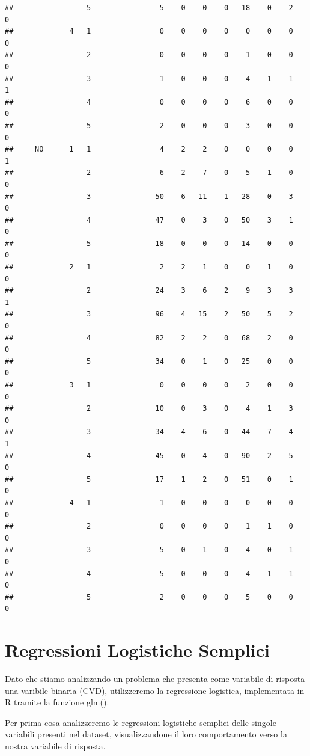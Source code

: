 \documentclass{article}\usepackage[]{graphicx}\usepackage[]{xcolor}
\makeatletter
\newenvironment{kframe}{%
 \def\at@end@of@kframe{}%
 \ifinner\ifhmode%
  \def\at@end@of@kframe{\end{minipage}}%
  \begin{minipage}{\columnwidth}%
 \fi\fi%
 \def\FrameCommand##1{\hskip\@totalleftmargin \hskip-\fboxsep
 \colorbox{shadecolor}{##1}\hskip-\fboxsep
     \hskip-\linewidth \hskip-\@totalleftmargin \hskip\columnwidth}%
 \MakeFramed {\advance\hsize-\width
   \@totalleftmargin\z@ \linewidth\hsize
   \@setminipage}}%
 {\par\unskip\endMakeFramed%
 \at@end@of@kframe}
\newenvironment{knitrout}{}{} %
\makeatother
\begin{document}
\begin{knitrout}
\begin{kframe}
\begin{verbatim}
##                 5                5    0    0    0   18    0    2    0
##             4   1                0    0    0    0    0    0    0    0
##                 2                0    0    0    0    1    0    0    0
##                 3                1    0    0    0    4    1    1    1
##                 4                0    0    0    0    6    0    0    0
##                 5                2    0    0    0    3    0    0    0
##     NO      1   1                4    2    2    0    0    0    0    1
##                 2                6    2    7    0    5    1    0    0
##                 3               50    6   11    1   28    0    3    0
##                 4               47    0    3    0   50    3    1    0
##                 5               18    0    0    0   14    0    0    0
##             2   1                2    2    1    0    0    1    0    0
##                 2               24    3    6    2    9    3    3    1
##                 3               96    4   15    2   50    5    2    0
##                 4               82    2    2    0   68    2    0    0
##                 5               34    0    1    0   25    0    0    0
##             3   1                0    0    0    0    2    0    0    0
##                 2               10    0    3    0    4    1    3    0
##                 3               34    4    6    0   44    7    4    1
##                 4               45    0    4    0   90    2    5    0
##                 5               17    1    2    0   51    0    1    0
##             4   1                1    0    0    0    0    0    0    0
##                 2                0    0    0    0    1    1    0    0
##                 3                5    0    1    0    4    0    1    0
##                 4                5    0    0    0    4    1    1    0
##                 5                2    0    0    0    5    0    0    0
\end{verbatim}
\end{kframe}
\end{knitrout}
    
\clearpage


\section{Regressioni Logistiche Semplici}
  Dato che stiamo analizzando un problema che presenta come variabile di 
  risposta una varibile binaria (CVD), utilizzeremo la regressione logistica, 
  implementata in R tramite la funzione glm(). \par
  Per prima cosa analizzeremo le regressioni logistiche semplici delle singole
  variabili presenti nel dataset, visualizzandone il loro comportamento verso la
  nostra variabile di risposta.
  
\end{document}
